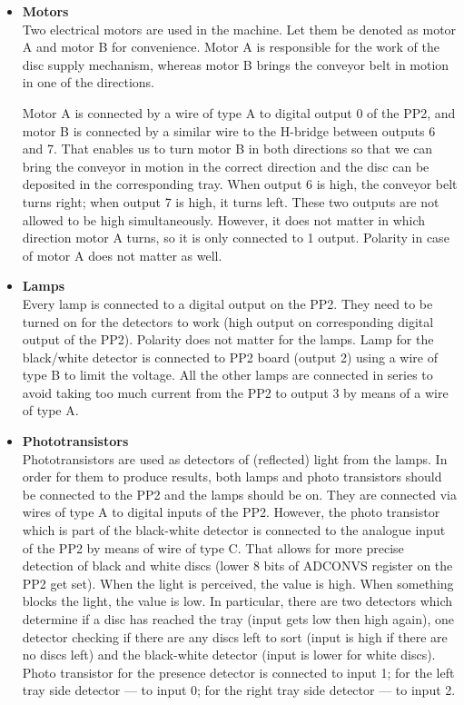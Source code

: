 \documentclass[a4paper,oneside,11pt]{report}
\begin{document}
\begin{itemize}
\item \textbf{Motors}\\
    Two electrical motors are used in the machine. Let them be denoted as motor A and motor B for convenience. Motor A is responsible for the work of the disc supply mechanism, whereas motor B brings the conveyor belt in motion in one of the directions.

    Motor A is connected by a wire of type A to digital output 0 of the PP2, and motor B is connected by a similar wire to the H-bridge between outputs 6 and 7. That enables us to turn motor B in both directions so that we can bring the conveyor in motion in the correct direction and the disc can be deposited in the corresponding tray. When output 6 is high, the conveyor belt turns right; when output 7 is high, it turns left. These two outputs are not allowed to be high simultaneously. However, it does not matter in which direction motor A turns, so it is only connected to 1 output. Polarity in case of motor A does not matter as well.

\item \textbf{Lamps}\\
    Every lamp is connected to a digital output on the PP2. They need to be turned on for the detectors to work (high output on corresponding digital output of the PP2). Polarity does not matter for the lamps. Lamp for the black/white detector is connected to PP2 board (output 2) using a wire of type B to limit the voltage. All the other lamps are connected in series to avoid taking too much current from the PP2 to output 3 by means of a wire of type A.

\item \textbf{Phototransistors}\\
    Phototransistors are used as detectors of (reflected) light from the lamps. In order for them to produce results, both lamps and photo transistors should be connected to the PP2 and the lamps should be on. They are connected via wires of type A to digital inputs of the PP2. However, the photo transistor which is part of the black-white detector is connected to the analogue input of the PP2 by means of wire of type C. That allows for more precise detection of black and white discs (lower 8 bits of ADCONVS register on the PP2 get set). When the light is perceived, the value is high. When something blocks the light, the value is low. In particular, there are two detectors which determine if a disc has reached the tray (input gets low then high again), one detector checking if there are any discs left to sort (input is high if there are no discs left) and the black-white detector (input is lower for white discs). Photo transistor for the presence detector is connected to input 1; for the left tray side detector --- to input 0; for the right tray side detector --- to input 2.


\end{itemize}
\end{document}
